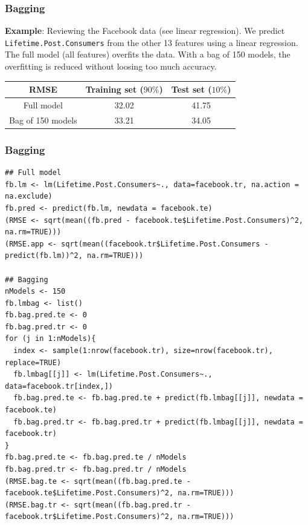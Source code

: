 \begin{frame}
\frametitle{Bagging}
{\bf Example}: Reviewing the Facebook data (see linear regression). We predict {\tt Lifetime.Post.Consumers} from the other 13 features using a linear regression. The full model (all features) overfits the data. With a bag of 150 models, the overfitting is reduced without loosing too much accuracy.
\begin{center}
\begin{tabular}{c|c|c|}
RMSE & Training set ($90\%$)& Test set ($10\%$)\\
\hline
Full model & 32.02 & 41.75\\
\hline
Bag of 150 models & 33.21 & 34.05\\
\hline
\end{tabular}
\end{center}
\end{frame}
\begin{frame}[fragile]
\frametitle{Bagging}
\tiny
\begin{verbatim}
## Full model
fb.lm <- lm(Lifetime.Post.Consumers~., data=facebook.tr, na.action = na.exclude)
fb.pred <- predict(fb.lm, newdata = facebook.te)
(RMSE <- sqrt(mean((fb.pred - facebook.te$Lifetime.Post.Consumers)^2, na.rm=TRUE)))
(RMSE.app <- sqrt(mean((facebook.tr$Lifetime.Post.Consumers - predict(fb.lm))^2, na.rm=TRUE)))

## Bagging
nModels <- 150
fb.lmbag <- list()
fb.bag.pred.te <- 0
fb.bag.pred.tr <- 0
for (j in 1:nModels){
  index <- sample(1:nrow(facebook.tr), size=nrow(facebook.tr), replace=TRUE)
  fb.lmbag[[j]] <- lm(Lifetime.Post.Consumers~., data=facebook.tr[index,])
  fb.bag.pred.te <- fb.bag.pred.te + predict(fb.lmbag[[j]], newdata = facebook.te)
  fb.bag.pred.tr <- fb.bag.pred.tr + predict(fb.lmbag[[j]], newdata = facebook.tr)
}
fb.bag.pred.te <- fb.bag.pred.te / nModels
fb.bag.pred.tr <- fb.bag.pred.tr / nModels
(RMSE.bag.te <- sqrt(mean((fb.bag.pred.te - facebook.te$Lifetime.Post.Consumers)^2, na.rm=TRUE)))
(RMSE.bag.tr <- sqrt(mean((fb.bag.pred.tr - facebook.tr$Lifetime.Post.Consumers)^2, na.rm=TRUE)))
\end{verbatim}
\end{frame}

